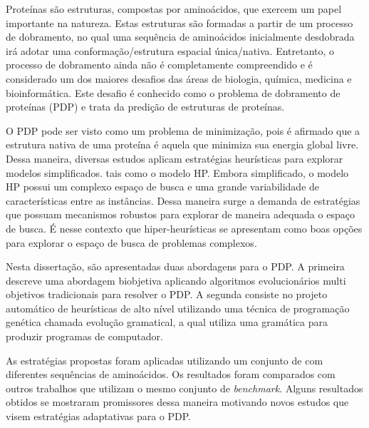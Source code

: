 \begin{resumo}


Proteínas são estruturas, compostas por aminoácidos, que exercem um papel importante na natureza. Estas estruturas são formadas a partir de um processo de dobramento, no qual uma sequência de aminoácidos inicialmente desdobrada irá adotar uma conformação/estrutura espacial única/nativa. Entretanto, o processo de dobramento ainda não é completamente compreendido e é considerado um dos maiores desafios das áreas de biologia, química, medicina e bioinformática. Este desafio é conhecido como o problema de dobramento de proteínas (PDP) e trata da predição de estruturas de proteínas. 

O PDP pode ser visto como um problema de minimização, pois é afirmado que a estrutura nativa de uma proteína é aquela que minimiza sua energia global livre. Dessa maneira, diversas estudos aplicam estratégias heurísticas para explorar modelos simplificados. tais como o modelo HP. Embora simplificado, o modelo HP possui um complexo espaço de busca e uma grande variabilidade de características entre as instâncias. Dessa maneira surge a demanda de estratégias que possuam mecanismos robustos para explorar de maneira adequada o espaço de busca. É nesse contexto que hiper-heurísticas se apresentam como boas opções para explorar o espaço de busca de problemas complexos. 



Nesta dissertação, são apresentadas duas abordagens para o PDP. A primeira descreve uma abordagem biobjetiva aplicando  algoritmos evolucionários multi objetivos tradicionais para resolver o PDP. A segunda consiste no projeto automático de heurísticas de alto nível utilizando uma técnica de programação genética chamada evolução gramatical, a qual utiliza uma gramática para produzir programas de computador. 

 As estratégias propostas foram aplicadas utilizando um conjunto de  com diferentes sequências de aminoácidos. Os resultados foram comparados com outros trabalhos que utilizam o mesmo conjunto de \textit{benchmark}. Alguns resultados obtidos se mostraram promissores dessa maneira motivando novos estudos que visem estratégias adaptativas para o PDP.



\end{resumo}

